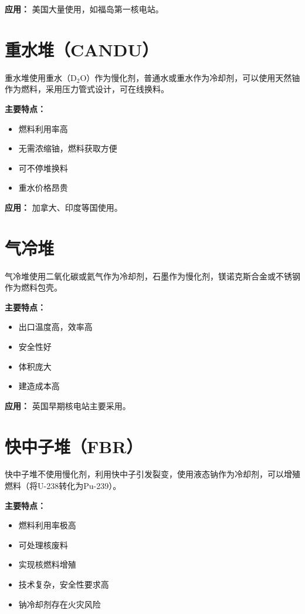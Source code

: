 \documentclass[12pt,UTF8]{ctexbook}
\begin{document}
\textbf{应用：} 美国大量使用，如福岛第一核电站。

\section{重水堆（CANDU）}

重水堆使用重水（D$_2$O）作为慢化剂，普通水或重水作为冷却剂，可以使用天然铀作为燃料，采用压力管式设计，可在线换料。

\textbf{主要特点：}
\begin{itemize}[leftmargin=2cm]
    \item 燃料利用率高
    \item 无需浓缩铀，燃料获取方便
    \item 可不停堆换料
    \item 重水价格昂贵
\end{itemize}

\textbf{应用：} 加拿大、印度等国使用。

\section{气冷堆}

气冷堆使用二氧化碳或氦气作为冷却剂，石墨作为慢化剂，镁诺克斯合金或不锈钢作为燃料包壳。

\textbf{主要特点：}
\begin{itemize}[leftmargin=2cm]
    \item 出口温度高，效率高
    \item 安全性好
    \item 体积庞大
    \item 建造成本高
\end{itemize}

\textbf{应用：} 英国早期核电站主要采用。

\section{快中子堆（FBR）}

快中子堆不使用慢化剂，利用快中子引发裂变，使用液态钠作为冷却剂，可以增殖燃料（将U-238转化为Pu-239）。

\textbf{主要特点：}
\begin{itemize}[leftmargin=2cm]
    \item 燃料利用率极高
    \item 可处理核废料
    \item 实现核燃料增殖
    \item 技术复杂，安全性要求高
    \item 钠冷却剂存在火灾风险
\end{itemize}
\end{document}
